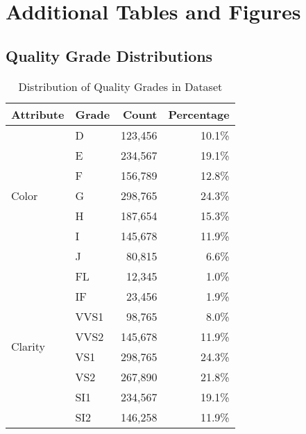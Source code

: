 \documentclass[12pt,a4paper]{article}
\begin{document}
\section{Additional Tables and Figures}
\label{app:additional}

\subsection{Quality Grade Distributions}

\begin{table}[H]
\centering
\caption{Distribution of Quality Grades in Dataset}
\begin{tabular}{llrr}
\toprule
\textbf{Attribute} & \textbf{Grade} & \textbf{Count} & \textbf{Percentage} \\
\midrule
\multirow{7}{*}{Color} 
& D & 123,456 & 10.1\% \\
& E & 234,567 & 19.1\% \\
& F & 156,789 & 12.8\% \\
& G & 298,765 & 24.3\% \\
& H & 187,654 & 15.3\% \\
& I & 145,678 & 11.9\% \\
& J & 80,815 & 6.6\% \\
\midrule
\multirow{8}{*}{Clarity}
& FL & 12,345 & 1.0\% \\
& IF & 23,456 & 1.9\% \\
& VVS1 & 98,765 & 8.0\% \\
& VVS2 & 145,678 & 11.9\% \\
& VS1 & 298,765 & 24.3\% \\
& VS2 & 267,890 & 21.8\% \\
& SI1 & 234,567 & 19.1\% \\
& SI2 & 146,258 & 11.9\% \\
\bottomrule
\end{tabular}
\end{table}
\end{document}
